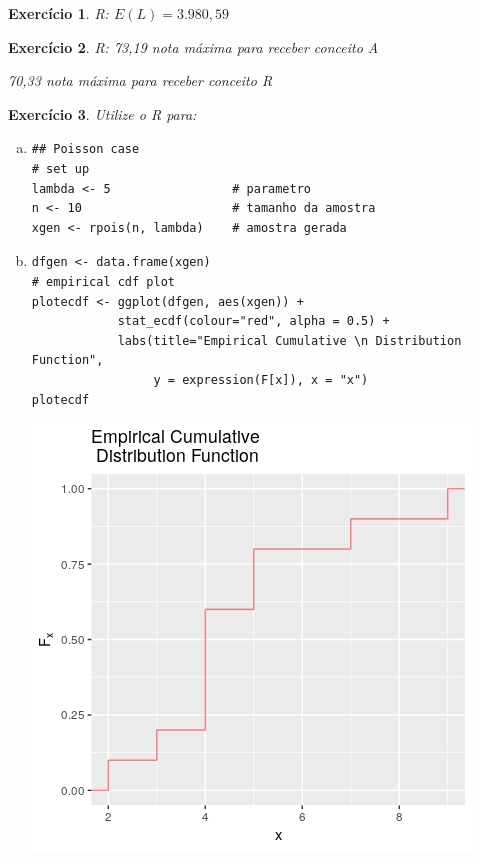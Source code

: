 \documentclass[letter,11pt]{article}
\newtheorem{exer}{Exercício}
\begin{document}
\medskip
\begin{exer} \rm R: $E(L)=3.980,59$
\end{exer}



\medskip
\begin{exer} \rm R: 73,19 	nota máxima para receber conceito A

70,33	nota máxima para receber conceito R
\end{exer}




\medskip
\begin{exer} \rm
Utilize o R para:
\begin{enumerate}[a)]
  \item 
  \begin{verbatim}
## Poisson case
# set up
lambda <- 5                 # parametro
n <- 10                     # tamanho da amostra
xgen <- rpois(n, lambda)    # amostra gerada
  \end{verbatim}
  \item 
  \begin{verbatim}
dfgen <- data.frame(xgen)
# empirical cdf plot  
plotecdf <- ggplot(dfgen, aes(xgen)) + 
            stat_ecdf(colour="red", alpha = 0.5) + 
            labs(title="Empirical Cumulative \n Distribution Function", 
                 y = expression(F[x]), x = "x")
plotecdf
  \end{verbatim}
  \includegraphics[scale=0.5]{exe_ecdf1}
  

\end{enumerate}
\end{exer}
\end{document}
